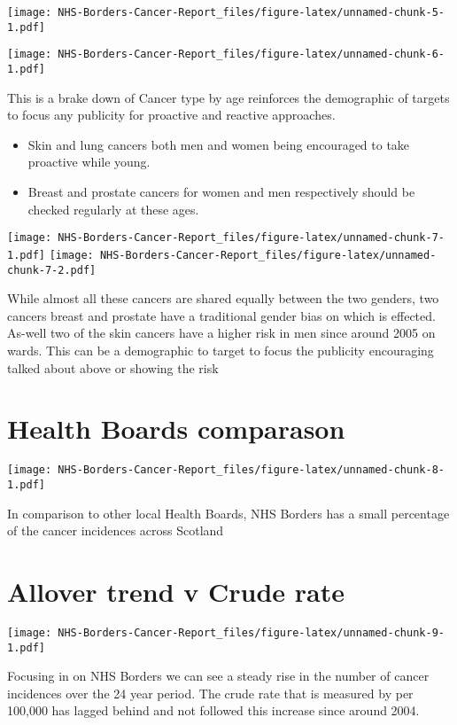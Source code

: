 \documentclass[
]{article}
\begin{document}
\texttt{[image: NHS-Borders-Cancer-Report\_files/figure-latex/unnamed-chunk-5-1.pdf]}

\texttt{[image: NHS-Borders-Cancer-Report\_files/figure-latex/unnamed-chunk-6-1.pdf]}

This is a brake down of Cancer type by age reinforces the demographic of
targets to focus any publicity for proactive and reactive approaches.

\begin{itemize}
\item
  Skin and lung cancers both men and women being encouraged to take
  proactive while young.
\item
  Breast and prostate cancers for women and men respectively should be
  checked regularly at these ages.
\end{itemize}

\texttt{[image: NHS-Borders-Cancer-Report\_files/figure-latex/unnamed-chunk-7-1.pdf]}
\texttt{[image: NHS-Borders-Cancer-Report\_files/figure-latex/unnamed-chunk-7-2.pdf]}

While almost all these cancers are shared equally between the two
genders, two cancers breast and prostate have a traditional gender bias
on which is effected. As-well two of the skin cancers have a higher risk
in men since around 2005 on wards. This can be a demographic to target
to focus the publicity encouraging talked about above or showing the
risk

\hypertarget{health-boards-comparason}{%
\section{Health Boards comparason}\label{health-boards-comparason}}

\texttt{[image: NHS-Borders-Cancer-Report\_files/figure-latex/unnamed-chunk-8-1.pdf]}

In comparison to other local Health Boards, NHS Borders has a small
percentage of the cancer incidences across Scotland

\hypertarget{allover-trend-v-crude-rate}{%
\section{Allover trend v Crude rate}\label{allover-trend-v-crude-rate}}

\texttt{[image: NHS-Borders-Cancer-Report\_files/figure-latex/unnamed-chunk-9-1.pdf]}

Focusing in on NHS Borders we can see a steady rise in the number of
cancer incidences over the 24 year period. The crude rate that is
measured by per 100,000 has lagged behind and not followed this increase
since around 2004.
\end{document}
